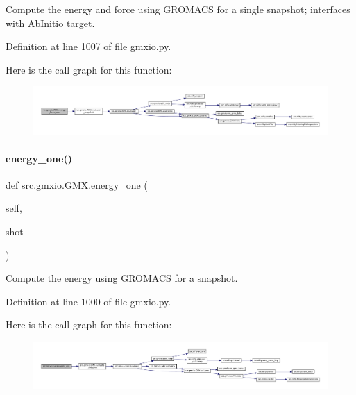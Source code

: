 Compute the energy and force using G\+R\+O\+M\+A\+CS for a single snapshot; interfaces with Ab\+Initio target. 



Definition at line 1007 of file gmxio.\+py.

Here is the call graph for this function\+:
\nopagebreak
\begin{figure}[H]
\begin{center}
\leavevmode
\includegraphics[width=350pt]{classsrc_1_1gmxio_1_1GMX_a1d9129c7e9e4e081ee985256338ec663_cgraph}
\end{center}
\end{figure}
\mbox{\label{classsrc_1_1gmxio_1_1GMX_ae025c413d18359468ccaeb5e86eaf130}} 
\paragraph{\texorpdfstring{energy\+\_\+one()}{energy\_one()}}
{\footnotesize\ttfamily def src.\+gmxio.\+G\+M\+X.\+energy\+\_\+one (\begin{DoxyParamCaption}\item[{}]{self,  }\item[{}]{shot }\end{DoxyParamCaption})}



Compute the energy using G\+R\+O\+M\+A\+CS for a snapshot. 



Definition at line 1000 of file gmxio.\+py.

Here is the call graph for this function\+:
\nopagebreak
\begin{figure}[H]
\begin{center}
\leavevmode
\includegraphics[width=350pt]{classsrc_1_1gmxio_1_1GMX_ae025c413d18359468ccaeb5e86eaf130_cgraph}
\end{center}
\end{figure}
\mbox{\label{classsrc_1_1gmxio_1_1GMX_ab545f644dac9947905b0b8c64d5f9c6d}} 
